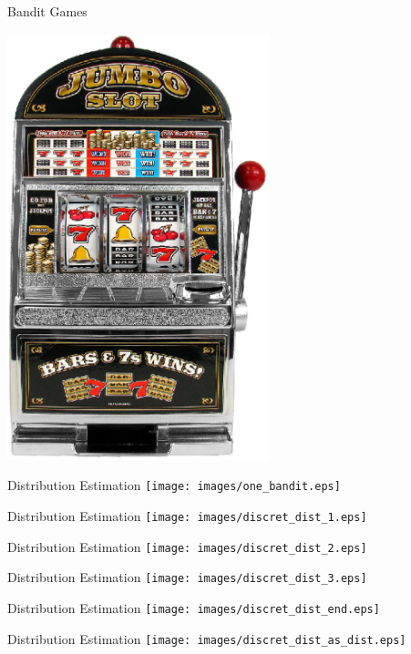 \documentclass{powerdot}
\begin{document}
\begin{slide}{Bandit Games}

  \includegraphics[width=3in]{images/one-armed-bandit.eps}

\end{slide}

\begin{slide}{Distribution Estimation}
  \texttt{[image: images/one\_bandit.eps]}
\end{slide}
\begin{slide}[toc=]{Distribution Estimation}
  \texttt{[image: images/discret\_dist\_1.eps]}
\end{slide}

\begin{slide}[toc=]{Distribution Estimation}
  \texttt{[image: images/discret\_dist\_2.eps]}
\end{slide}

\begin{slide}[toc=]{Distribution Estimation}
  \texttt{[image: images/discret\_dist\_3.eps]}
\end{slide}
\begin{slide}[toc=]{Distribution Estimation}
  \texttt{[image: images/discret\_dist\_end.eps]}
\end{slide}

\begin{slide}[toc=]{Distribution Estimation}
  \texttt{[image: images/discret\_dist\_as\_dist.eps]}
\end{slide}
\end{document}

